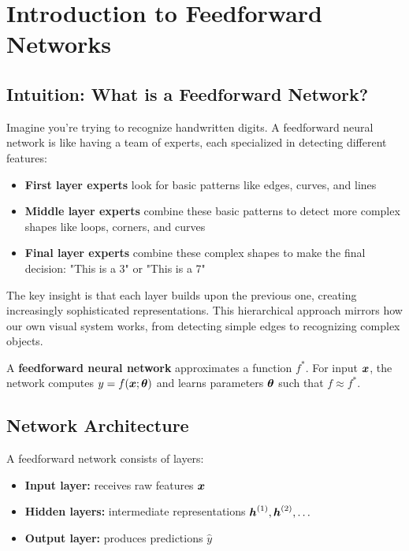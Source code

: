 
\section{Introduction to Feedforward Networks}
\label{sec:intro-feedforward}

\subsection{Intuition: What is a Feedforward Network?}

Imagine you're trying to recognize handwritten digits. A feedforward neural network is like having a team of experts, each specialized in detecting different features:

\begin{itemize}
    \item \textbf{First layer experts} look for basic patterns like edges, curves, and lines
    \item \textbf{Middle layer experts} combine these basic patterns to detect more complex shapes like loops, corners, and curves
    \item \textbf{Final layer experts} combine these complex shapes to make the final decision: "This is a 3" or "This is a 7"
\end{itemize}

The key insight is that each layer builds upon the previous one, creating increasingly sophisticated representations. This hierarchical approach mirrors how our own visual system works, from detecting simple edges to recognizing complex objects.

A \textbf{feedforward neural network} approximates a function $f^*$. For input $\boldsymbol{x}$, the network computes $y = f(\boldsymbol{x}; \boldsymbol{\theta})$ and learns parameters $\boldsymbol{\theta}$ such that $f \approx f^*$.

\subsection{Network Architecture}

A feedforward network consists of layers:
\begin{itemize}
    \item \textbf{Input layer:} receives raw features $\boldsymbol{x}$
    \item \textbf{Hidden layers:} intermediate representations $\boldsymbol{h}^{(1)}, \boldsymbol{h}^{(2)}, \ldots$
    \item \textbf{Output layer:} produces predictions $\hat{y}$
\end{itemize}

